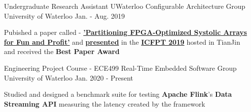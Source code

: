 


\begin{cventries}


\cventry
{Undergraduate Research Assistant} %
{UWaterloo Configurable Architecture Group} %
{University of Waterloo} %
{Jan. - Aug. 2019} %
{ %
\begin{cvitems}
\item {
    Pubished a paper called - 
    \textbf{
        \href{https://git.uwaterloo.ca/watcag-public/fpga-syspart}
        {'Partitioning FPGA-Optimized Systolic Arrays for Fun and Profit'}}
    and 
    \textbf{
        \href{https://www.youtube.com/watch?v=nVLZWJdZ-64}
        {presented}}
    in the 
    \textbf{
        \href{http://fpt19.tju.edu.cn/Registration.htm}
        {ICFPT 2019}}
    hosted in TianJin and received the \textbf{Best Paper Award}
}
\end{cvitems}
}


\cventry
{Engineering Project Course - ECE499} %
{Real-Time Embedded Software Group} %
{University of Waterloo} %
{Jan. 2020 - Present} %
{ %
\begin{cvitems}
\item {
    Studied and designed a benchmark suite for testing 
    \textbf{Apache Flink}'s \textbf{Data Streaming API}
    measuring the latency created by the framework
}
\end{cvitems}
}

\end{cventries}